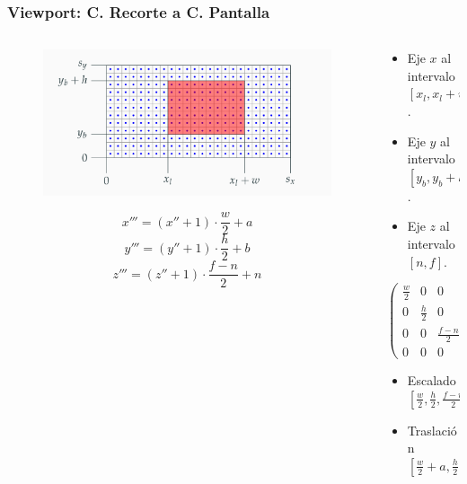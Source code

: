 \documentclass[pdf]{beamer}
\begin{document}
\begin{frame}
	\frametitle{Viewport: C. Recorte a C. Pantalla}
	\begin{columns}
		\begin{column}{0.5\textwidth}
		\begin{figure}
		\centering
		\includegraphics[width=\textwidth]{viewport}
	\end{figure}
\begin{equation*}
	x''' = (x''+1)\cdot \frac{w}{2}+a
\end{equation*}
\begin{equation*}
	y''' = (y''+1)\cdot \frac{h}{2}+b
\end{equation*}
\begin{equation*}
	z''' = (z''+1)\cdot \frac{f-n}{2}+n
\end{equation*}
			
	\end{column}
\begin{column}{0.5\textwidth}
	\begin{itemize}
		\item Eje $x$ al intervalo $[x_l, x_l+w]$.
		\item Eje $y$ al intervalo $[y_b, y_b+h]$.
		\item Eje $z$ al intervalo $[n, f]$.
		
	\end{itemize}
\begin{block}{}


$$\begin{pmatrix}
	\frac{w}{2} &0&0&\frac{w}{2}+a\\
	0&\frac{h}{2} &0&\frac{h}{2}+b\\
	0&0&\frac{f-n}{2} & \frac{f+n}{2}\\
	0&0&0&1
\end{pmatrix}$$

\begin{itemize}
	\item Escalado $[\frac{w}{2}, \frac{h}{2}, \frac{f-n}{2}]$ 
	\item Traslación $[\frac{w}{2}+a, \frac{h}{2}+b, \frac{f+n}{2}]$
\end{itemize}
\end{block}
\end{column}
\end{columns}


\end{frame}
\end{document}
